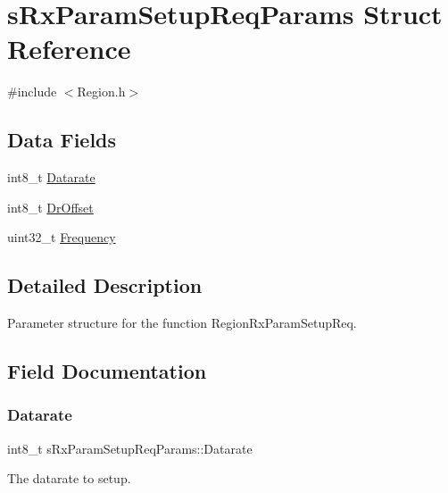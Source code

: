 \hypertarget{structsRxParamSetupReqParams}{}\section{s\+Rx\+Param\+Setup\+Req\+Params Struct Reference}
\label{structsRxParamSetupReqParams}


{\ttfamily \#include $<$Region.\+h$>$}

\subsection*{Data Fields}
\begin{DoxyCompactItemize}
\item 
int8\+\_\+t \hyperlink{structsRxParamSetupReqParams_a1fae2b65e9f79e72bcf0a92827c7e1ac}{Datarate}
\item 
int8\+\_\+t \hyperlink{structsRxParamSetupReqParams_a8c50f3e69c50560ec3c21edc974104ef}{Dr\+Offset}
\item 
uint32\+\_\+t \hyperlink{structsRxParamSetupReqParams_a2cf70cbc0939be65e8c1257e45ae5530}{Frequency}
\end{DoxyCompactItemize}


\subsection{Detailed Description}
Parameter structure for the function Region\+Rx\+Param\+Setup\+Req. 

\subsection{Field Documentation}
\mbox{\label{structsRxParamSetupReqParams_a1fae2b65e9f79e72bcf0a92827c7e1ac}} 
\subsubsection{\texorpdfstring{Datarate}{Datarate}}
{\footnotesize\ttfamily int8\+\_\+t s\+Rx\+Param\+Setup\+Req\+Params\+::\+Datarate}

The datarate to setup. \mbox{\label{structsRxParamSetupReqParams_a8c50f3e69c50560ec3c21edc974104ef}} 

